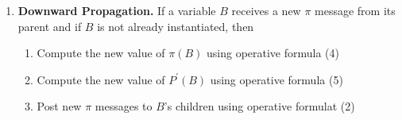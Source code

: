 \documentclass[12pt,twoside]{article}
\begin{document}
\begin{enumerate}
\begin{enumerate}
\item \textbf{Downward Propagation.} If a variable $B$ receives a new  $\pi$ message from its parent and if $B$ is not already instantiated, then
	\begin{enumerate}
		\item Compute the new value of $\pi(B)$ using operative formula (4)
		\item Compute the new value of $P^\prime(B)$ using operative formula (5)
		\item Post new $\pi$ messages to $B$'s children using operative formulat (2)
	\end{enumerate}

 \end{enumerate}



\end{enumerate}

\newpage
\end{document}

